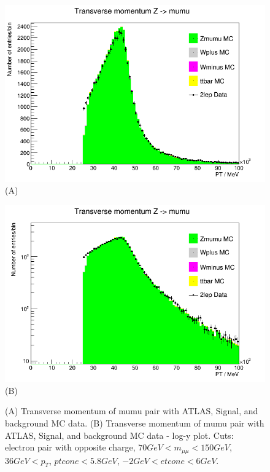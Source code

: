 \begin{figure}[h!]
    \centering
    \begin{minipage}{0.5\textwidth}
        \centering
        \includegraphics[width=\linewidth]{plots/03-03-2021/10-20_03-03-21.png}
        (A)
    \end{minipage}\hfill
    \begin{minipage}{0.5\textwidth}
        \centering
        \includegraphics[width=\linewidth]{plots/03-03-2021/10-21_03-03-21.png}
        (B) 
    \end{minipage}
    \caption{(A) Transverse momentum of mumu pair with ATLAS, Signal, and background MC data. (B) Transverse momentum of mumu pair with ATLAS, Signal, and background MC data - log-y plot.  Cuts: electron pair with opposite charge, $70 GeV < m_{\mu\mu} < 150 GeV$, $36 GeV < p_T$, $ ptcone < 5.8 GeV$, $ -2 GeV < etcone < 6 GeV$.}
    \label{fig:10-20_03-03-21}
\end{figure}

